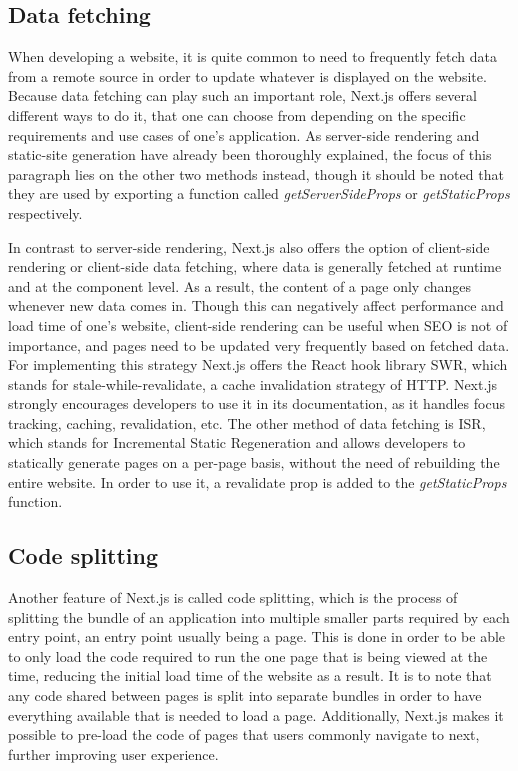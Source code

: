 \subsection{Data fetching}
When developing a website, it is quite common to need to frequently fetch data from a remote source in order to update whatever is displayed
on the website. Because data fetching can play such an important role, Next.js offers several different ways to do it, that one can choose
from depending on the specific requirements and use cases of one's application. As server-side rendering and static-site generation have already
been thoroughly explained, the focus of this paragraph lies on the other two methods instead, though it should be noted that they are used by
exporting a function called \emph{getServerSideProps} or \emph{getStaticProps} respectively.

In contrast to server-side rendering, Next.js also offers the
option of client-side rendering or client-side data fetching, where data is generally fetched at runtime and at the component level. As a
result, the content of a page only changes whenever new data comes in. Though this can negatively affect performance and load time of one's
website, client-side rendering can be useful when SEO is not of importance, and pages need to be updated very frequently based on fetched data.
For implementing this strategy Next.js offers the React hook library SWR, which stands for stale-while-revalidate, a cache invalidation strategy
of HTTP. Next.js strongly encourages developers to use it in its documentation, as it handles focus tracking, caching, revalidation, etc. The
other method of data fetching is ISR, which stands for Incremental Static Regeneration and allows developers to statically generate pages on a
per-page basis, without the need of rebuilding the entire website. In order to use it, a revalidate prop is added to the \emph{getStaticProps} function. \cite{NextjsDataFetching}

\subsection{Code splitting}
Another feature of Next.js is called code splitting, which is the process of splitting the bundle of an application into multiple smaller parts
required by each entry point, an entry point usually being a page. This is done in order to be able to only load the code required to run the one
page that is being viewed at the time, reducing the initial load time of the website as a result. It is to note that any code shared between pages
is split into separate bundles in order to have everything available that is needed to load a page. Additionally, Next.js makes it possible to
pre-load the code of pages that users commonly navigate to next, further improving user experience. \cite{NextjsCodeSplitting}

